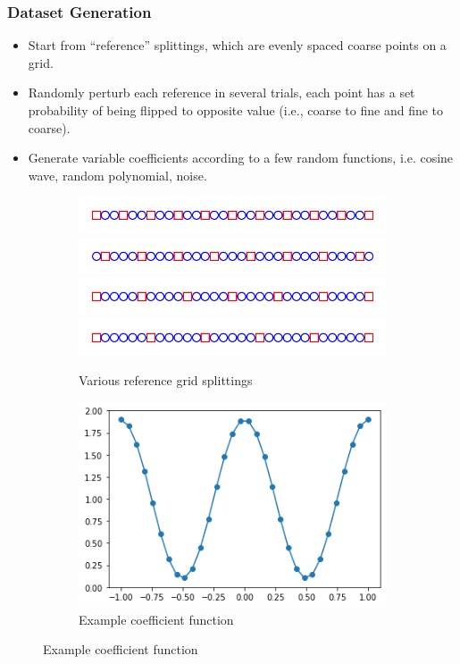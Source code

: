 \documentclass[handout]{beamer}
\begin{document}
\begin{frame}
  \frametitle{Dataset Generation}
  \begin{itemize}
  \item Start from ``reference'' splittings, which are evenly spaced coarse points on a grid.
  \item Randomly perturb each reference in several trials, each point has a set probability of being flipped to opposite value (i.e., coarse to fine and fine to coarse).
  \item Generate variable coefficients according to a few random functions, i.e. cosine wave, random polynomial, noise.
  \end{itemize}
  \begin{figure}[h]
  \centering
  \begin{subfigure}{.48\textwidth}
    \includegraphics[width=\textwidth]{figures/grid1.png}
    \includegraphics[width=\textwidth]{figures/grid2.png}
    \includegraphics[width=\textwidth]{figures/grid3.png}
    \includegraphics[width=\textwidth]{figures/grid4.png}
    \caption{Various reference grid splittings}
  \end{subfigure}
  \begin{subfigure}{.48\textwidth}
    \includegraphics[width=\textwidth]{figures/coeff_ex.png}
    \caption{Example coefficient function}
  \end{subfigure}
  \end{figure}
\end{frame}
\end{document}
